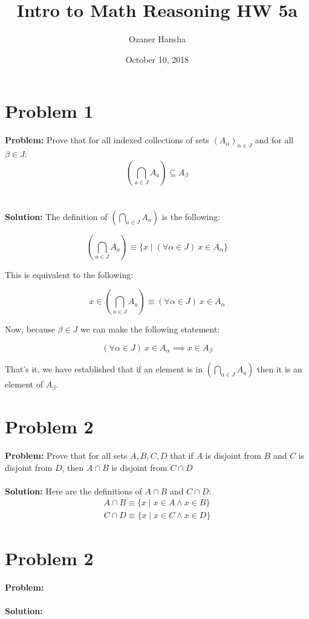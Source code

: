 \documentclass{article}
\begin{document}
\title{Intro to Math Reasoning HW 5a}
\author{Ozaner Hansha}
\date{October 10, 2018}
\maketitle

\section*{Problem 1}
\textbf{Problem:} Prove that for all indexed collections of sets $(A_\alpha)_{\alpha\in J}$ and for all $\beta\in J$:
$$\left(\bigcap_{a\in J}A_a\right)\subseteq A_\beta$$
\\\\
\textbf{Solution:} The definition of $\left(\bigcap_{a\in J}A_a\right)$ is the following:

$$\left(\bigcap_{a\in J}A_a\right)\equiv\{x\mid(\forall\alpha\in J)\ x\in A_\alpha\}$$

This is equivalent to the following:

$$x\in\left(\bigcap_{a\in J}A_a\right)\equiv (\forall\alpha\in J)\ x\in A_\alpha$$

Now, because $\beta\in J$ we can make the following statement:

$$(\forall\alpha\in J)\ x\in A_\alpha\implies x\in A_\beta$$

That's it, we have established that if an element is in $\left(\bigcap_{a\in J}A_a\right)$ then it is an element of $A_\beta$.

\section*{Problem 2}
\textbf{Problem:} Prove that for all sets $A,B,C,D$ that if $A$ is disjoint from $B$ and $C$ is disjoint from $D$, then $A\cap B$ is disjoint from $C\cap D$
\\\\
\textbf{Solution:} Here are the definitions of $A\cap B$ and $C\cap D$:
\begin{align*}
  A\cap B\equiv\{x\mid x\in A\wedge x\in B\}\\
  C\cap D\equiv\{x\mid x\in C\wedge x\in D\}
\end{align*}

\section*{Problem 2}
\textbf{Problem:}
\\\\
\textbf{Solution:}
\end{document}
